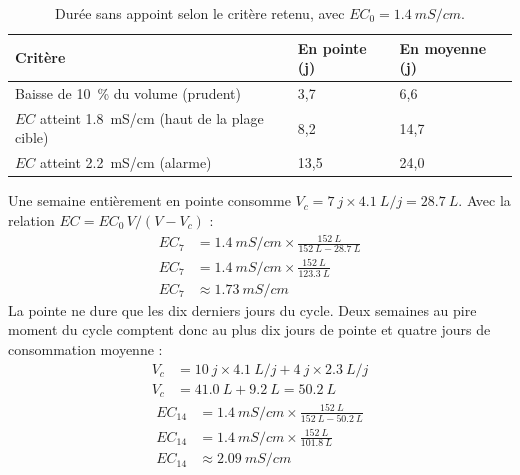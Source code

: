 \begin{table}[H]
\centering
\small
\renewcommand{\arraystretch}{1.1}
\begin{tabularx}{\textwidth}{|>{\raggedright\arraybackslash}p{6.4cm}|Y|Y|}
\hline
\textbf{Critère} & \textbf{En pointe (\unit{j})} & \textbf{En moyenne (\unit{j})} \\
\hline
Baisse de \qty{10}{\percent} du volume (prudent) & 3,7 & 6,6 \\
\hline
$EC$ atteint \qty{1,8}{mS/cm} (haut de la plage cible) & 8,2 & 14,7 \\
\hline
$EC$ atteint \qty{2,2}{mS/cm} (alarme) & 13,5 & 24,0 \\
\hline
\end{tabularx}
\caption{Durée sans appoint selon le critère retenu, avec $EC_0 = \qty{1,4}{mS/cm}$.}
\end{table}

\begin{demonstration}
Une semaine entièrement en pointe consomme $V_c = \qty{7}{j}\times\qty{4,1}{L/j} = \qty{28,7}{L}$. Avec la relation $EC = EC_0\,V/(V - V_c)$ :
\begin{align*}
EC_{7} &= \qty{1,4}{mS/cm}\times\frac{\qty{152}{L}}{\qty{152}{L} - \qty{28,7}{L}}\\
EC_{7} &= \qty{1,4}{mS/cm}\times\frac{\qty{152}{L}}{\qty{123,3}{L}}\\
EC_{7} &\approx \qty{1,73}{mS/cm}
\end{align*}
La pointe ne dure que les dix derniers jours du cycle. Deux semaines au pire moment du cycle comptent donc au plus dix jours de pointe et quatre jours de consommation moyenne :
\begin{align*}
V_c &= \qty{10}{j}\times\qty{4,1}{L/j} + \qty{4}{j}\times\qty{2,3}{L/j}\\
V_c &= \qty{41,0}{L} + \qty{9,2}{L} = \qty{50,2}{L}
\end{align*}
\begin{align*}
EC_{14} &= \qty{1,4}{mS/cm}\times\frac{\qty{152}{L}}{\qty{152}{L} - \qty{50,2}{L}}\\
EC_{14} &= \qty{1,4}{mS/cm}\times\frac{\qty{152}{L}}{\qty{101,8}{L}}\\
EC_{14} &\approx \qty{2,09}{mS/cm}
\end{align*}
\end{demonstration}

